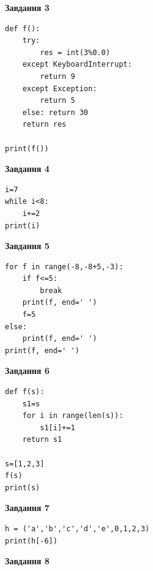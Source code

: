\documentclass[12pt, ukrainian]{article}
\begin{document}
{{{{{{{{{{{\begin{minipage}[t]{7.5cm}
\begin{center}
\textbf{Завдання 3}
\end{center}

\begin{verbatim}
def f():
    try:
        res = int(3%0.0)
    except KeyboardInterrupt: 
        return 9
    except Exception: 
        return 5
    else: return 30
    return res

print(f())
\end{verbatim}



\begin{center}
\textbf{Завдання 4}
\end{center}

\begin{verbatim}
i=7
while i<8:
    i+=2
print(i)
\end{verbatim}

\end{minipage}
\vline \hspace{6mm}
\begin{minipage}[t]{10.5cm}

\begin{center}
\textbf{Завдання 5}
\end{center}

\begin{verbatim}
for f in range(-8,-8+5,-3):
    if f<=5:
        break
    print(f, end=' ')
    f=5
else:
    print(f, end=' ')
print(f, end=' ')
\end{verbatim}



\begin{center}
\textbf{Завдання 6}
\end{center}

\begin{verbatim}
def f(s):
    s1=s
    for i in range(len(s)):
        s1[i]+=1
    return s1

s=[1,2,3]
f(s)
print(s)
\end{verbatim}



\begin{center}
\textbf{Завдання 7}
\end{center}

\begin{verbatim}
h = ('a','b','c','d','e',0,1,2,3)
print(h[-6])
\end{verbatim}



\begin{center}
\textbf{Завдання 8}
\end{center}


\end{minipage}}}}}}}}}}}}
\end{document}
